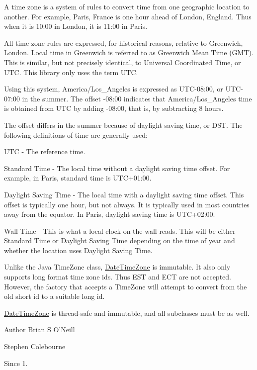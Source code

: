 A time zone is a system of rules to convert time from one geographic location to another. For example, Paris, France is one hour ahead of London, England. Thus when it is 10\-:00 in London, it is 11\-:00 in Paris. 

All time zone rules are expressed, for historical reasons, relative to Greenwich, London. Local time in Greenwich is referred to as Greenwich Mean Time (G\-M\-T). This is similar, but not precisely identical, to Universal Coordinated Time, or U\-T\-C. This library only uses the term U\-T\-C. 

Using this system, America/\-Los\-\_\-\-Angeles is expressed as U\-T\-C-\/08\-:00, or U\-T\-C-\/07\-:00 in the summer. The offset -\/08\-:00 indicates that America/\-Los\-\_\-\-Angeles time is obtained from U\-T\-C by adding -\/08\-:00, that is, by subtracting 8 hours. 

The offset differs in the summer because of daylight saving time, or D\-S\-T. The following definitions of time are generally used\-: 
\begin{DoxyItemize}
\item U\-T\-C -\/ The reference time. 
\item Standard Time -\/ The local time without a daylight saving time offset. For example, in Paris, standard time is U\-T\-C+01\-:00. 
\item Daylight Saving Time -\/ The local time with a daylight saving time offset. This offset is typically one hour, but not always. It is typically used in most countries away from the equator. In Paris, daylight saving time is U\-T\-C+02\-:00. 
\item Wall Time -\/ This is what a local clock on the wall reads. This will be either Standard Time or Daylight Saving Time depending on the time of year and whether the location uses Daylight Saving Time. 
\end{DoxyItemize}

Unlike the Java Time\-Zone class, \hyperlink{classorg_1_1joda_1_1time_1_1_date_time_zone}{Date\-Time\-Zone} is immutable. It also only supports long format time zone ids. Thus E\-S\-T and E\-C\-T are not accepted. However, the factory that accepts a Time\-Zone will attempt to convert from the old short id to a suitable long id. 

\hyperlink{classorg_1_1joda_1_1time_1_1_date_time_zone}{Date\-Time\-Zone} is thread-\/safe and immutable, and all subclasses must be as well.

\begin{DoxyAuthor}{Author}
Brian S O'Neill 

Stephen Colebourne 
\end{DoxyAuthor}
\begin{DoxySince}{Since}
1. 
\end{DoxySince}


